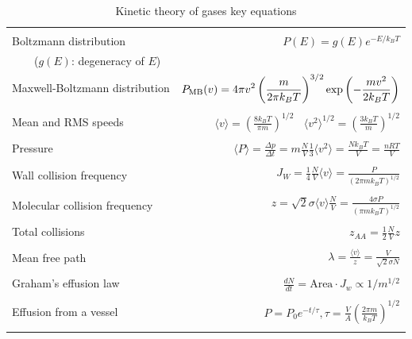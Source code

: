 \documentclass[11pt]{article}
\begin{document}
\begin{table} 
\begin{center}
    \caption{Kinetic theory of gases key equations}
    \begin{tabular}{|lr|}
     \hline
 & \\
Boltzmann distribution & $\displaystyle P(E) = g(E) e^{-E/k_BT}$ \\ \ \ \ \ ($g(E)$: degeneracy of
$E$) & \\ 
Maxwell-Boltzmann distribution & $ \displaystyle
P_{\rm MB}(v) = 4\pi v^2 \left( \frac{m}{2\pi k_B T}\right)^{3/2}\exp\left(-\frac{m
    v^2}{2k_B T}\right) $ \\  & \\
Mean and RMS speeds & 

$\displaystyle \langle v \rangle = \left( \frac{8 k_B T}{\pi m} \right)^{1/2} \ \ \ \ \langle v^2
\rangle^{1/2} = \left( \frac{3 k_B T}{m} \right)^{1/2} $ \\  & \\

Pressure & $
\displaystyle \langle P \rangle = \frac{\Delta p}{\Delta t} = m \frac{N}{V}\frac{1}{3}\langle v^2
\rangle = \frac{N k_B T}{V}=\frac{n R T}{V} $ \\ & \\ 

Wall collision frequency &
$ \displaystyle  J_W = \frac{1}{4}\frac{N}{V}\langle v \rangle=\frac{P}{\left( 2 \pi m k_B
    T\right)^{1/2}} $ \\ & \\

Molecular collision frequency &
$ \displaystyle  z=\sqrt{2} \sigma \langle v \rangle\frac{N}{V} = \frac{4\sigma P}{\left( \pi m k_B T
  \right)^{1/2}} $ \\ & \\

Total collisions &
$ \displaystyle z_{AA} = \frac{1}{2} \frac{N}{V} z$ \\ & \\

Mean free path &
$\displaystyle \lambda = \frac{ \langle v \rangle}{z} = \frac{V}{\sqrt{2} \sigma N} $
\\ & \\

Graham's effusion law & $\displaystyle \frac{dN}{dt}=\text{Area}\cdot  J_w \propto 1/m^{1/2} $
\\ & \\
Effusion from a vessel & $\displaystyle P=P_0 e^{-t/\tau}, \tau = \frac{V}{A}\left
  (\frac{2\pi m}{k_B T}\right )^{1/2} $ \\ & \\ 


\end{tabular}
\end{center}
\end{table}
\end{document}
